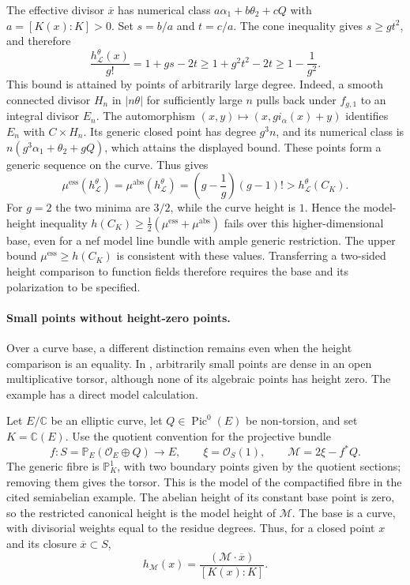 The effective divisor $\overline x$ has numerical class
$a\alpha_1+b\theta_2+cQ$ with $a=[K(x):K]>0$.
Set $s=b/a$ and $t=c/a$. The cone inequality gives $s\geq gt^2$,
and therefore
\[
 \frac{h^\theta_{\mathcal L}(x)}{g!}
       =1+gs-2t
       \geq1+g^2t^2-2t
       \geq1-\frac1{g^2}.
\]
This bound is attained by points of arbitrarily large degree.
Indeed, a smooth connected divisor $H_n$ in $|n\theta|$ for
sufficiently large $n$ pulls back under $f_{g,1}$ to an integral
divisor $E_n$. The automorphism
$(x,y)\mapsto(x,g i_\alpha(x)+y)$ identifies $E_n$ with
$C\times H_n$. Its generic closed point has degree $g^3n$,
and its numerical class is
$n(g^3\alpha_1+\theta_2+gQ)$, which attains the displayed bound.
These points form a generic sequence on the curve.
Thus \cite[Theorem~3.2]{GY26RelativeMinimaV2} gives
\[
 \mu^{\mathrm{ess}}(h^\theta_{\mathcal L})
   =\mu^{\mathrm{abs}}(h^\theta_{\mathcal L})
   =\left(g-\frac1g\right)(g-1)!
   >h^\theta_{\mathcal L}(C_K).
\]
For $g=2$ the two minima are $3/2$, while the curve height is $1$.
Hence the model-height inequality
$h(C_K)\geq\tfrac12(\mu^{\mathrm{ess}}+\mu^{\mathrm{abs}})$
fails over this higher-dimensional base, even for a nef model
line bundle with ample generic restriction.
The upper bound $\mu^{\mathrm{ess}}\geq h(C_K)$ is consistent
with these values. Transferring a two-sided height comparison
to function fields therefore requires the base and its polarization
to be specified.

\paragraph{Small points without height-zero points.}

Over a curve base, a different distinction remains even when the height
comparison is an equality.  In \cite[Example~1.2]{LY25SemiabelianV3},
arbitrarily small points are dense in an open multiplicative torsor,
although none of its algebraic points has height zero.  The example has
a direct model calculation.

Let $E/\mathbb C$ be an elliptic curve, let
$Q\in\operatorname{Pic}^0(E)$ be non-torsion, and set $K=\mathbb C(E)$.
Use the quotient convention for the projective bundle
\[
  f\colon S=\mathbb P_E(\mathcal O_E\oplus Q)\longrightarrow E,
  \qquad \xi=\mathcal O_S(1),
  \qquad \mathcal M=2\xi-f^*Q.
\]
The generic fibre is $\mathbb P^1_K$, with two boundary points given by
the quotient sections; removing them gives the torsor.  This is the model
of the compactified fibre in the cited semiabelian example.  The abelian
height of its constant base point is zero, so the restricted canonical
height is the model height of $\mathcal M$.  The base is a curve, with
divisorial weights equal to the residue degrees.  Thus, for a closed
point $x$ and its closure $\overline x\subset S$,
\[
  h_{\mathcal M}(x)=
    \frac{(\mathcal M\cdot\overline x)}{[K(x):K]}.
\]

